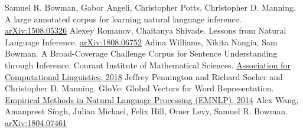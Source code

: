 \documentclass[12pt, conference]{IEEEtran}
\begin{document}
\begin{thebibliography}{00}

 Samuel R. Bowman, Gabor Angeli, Christopher Potts, Christopher D. Manning. A large annotated corpus for learning natural language inference. \href{https://arxiv.org/abs/1508.05326}{	arXiv:1508.05326}
 Alexey Romanov, Chaitanya Shivade. Lessons from Natural Language Inference. \href{https://arxiv.org/abs/1808.06752}{arXiv:1808.06752}
 Adina Williams, Nikita Nangia, Sam Bowman. A Broad-Coverage Challenge Corpus for Sentence Understanding through Inference. Courant Institute of Mathematical Sciences. \href{https://aclanthology.org/N18-1101}{Association for Computational Linguistics, 2018}
 Jeffrey Pennington and Richard Socher and Christopher D. Manning. GloVe: Global Vectors for Word Representation. \href{http://www.aclweb.org/anthology/D14-1162}{Empirical Methods in Natural Language Processing (EMNLP), 2014}
 Alex Wang, Amanpreet Singh, Julian Michael, Felix Hill, Omer Levy, Samuel R. Bowman. \href{https://arxiv.org/abs/1804.07461}{arXiv:1804.07461}
\end{thebibliography}
\end{document}
